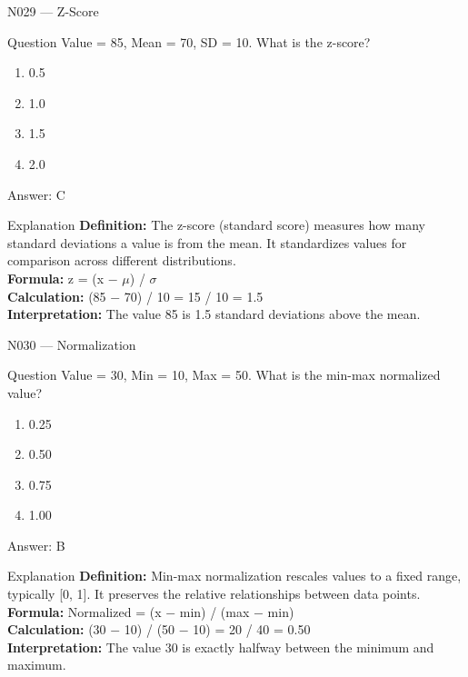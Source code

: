 \documentclass[aspectratio=169,8pt]{beamer}
\begin{document}
	\begin{frame}{N029 --- Z-Score}
		\begin{block}{Question}
			Value = 85, Mean = 70, SD = 10. What is the z-score?
			\begin{enumerate}
				\item 0.5
				\item 1.0
				\item 1.5
				\item 2.0
			\end{enumerate}
		\end{block}
		\begin{exampleblock}{Answer: C}\end{exampleblock}
		\begin{block}{Explanation}
			\textbf{Definition:} The z-score (standard score) measures how many standard deviations a value is from the mean. It standardizes values for comparison across different distributions.\\
			\textbf{Formula:} z = (x $-$ $\mu$) / $\sigma$\\
			\textbf{Calculation:} (85 $-$ 70) / 10 = 15 / 10 = 1.5\\
			\textbf{Interpretation:} The value 85 is 1.5 standard deviations above the mean.
		\end{block}
	\end{frame}
	
	\begin{frame}{N030 --- Normalization}
		\begin{block}{Question}
			Value = 30, Min = 10, Max = 50. What is the min-max normalized value?
			\begin{enumerate}
				\item 0.25
				\item 0.50
				\item 0.75
				\item 1.00
			\end{enumerate}
		\end{block}
		\begin{exampleblock}{Answer: B}\end{exampleblock}
		\begin{block}{Explanation}
			\textbf{Definition:} Min-max normalization rescales values to a fixed range, typically [0, 1]. It preserves the relative relationships between data points.\\
			\textbf{Formula:} Normalized = (x $-$ min) / (max $-$ min)\\
			\textbf{Calculation:} (30 $-$ 10) / (50 $-$ 10) = 20 / 40 = 0.50\\
			\textbf{Interpretation:} The value 30 is exactly halfway between the minimum and maximum.
		\end{block}
	\end{frame}
	
\end{document}
